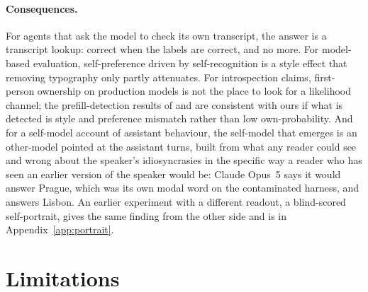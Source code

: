 \documentclass[twocolumn,10pt]{article}
\newcommand{\opus}{Claude Opus~5}
\begin{document}
\paragraph{Consequences.} For agents that ask the model to check its own transcript, the answer is a transcript lookup: correct when the labels are correct, and no more. For model-based evaluation, self-preference driven by self-recognition \citep{panickssery2024llm} is a style effect that removing typography only partly attenuates. For introspection claims, first-person ownership on production models is not the place to look for a likelihood channel; the prefill-detection results of \citet{lindsey2026emergent} and \citet{wang2026prefill} are consistent with ours if what is detected is style and preference mismatch rather than low own-probability. And for a self-model account of assistant behaviour, the self-model that emerges is an other-model pointed at the assistant turns, built from what any reader could see and wrong about the speaker's idiosyncrasies in the specific way a reader who has seen an earlier version of the speaker would be: \opus{} says it would answer Prague, which was its own modal word on the contaminated harness, and answers Lisbon. An earlier experiment with a different readout, a blind-scored self-portrait, gives the same finding from the other side and is in Appendix~\ref{app:portrait}.

\section{Limitations}
\end{document}
